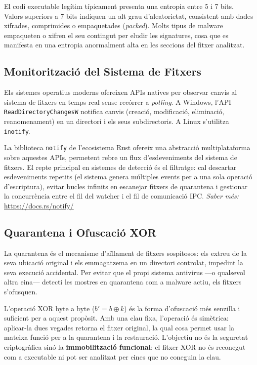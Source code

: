 \documentclass[12pt,a4paper]{report}
\begin{document}
El codi executable legítim típicament presenta una entropia entre 5 i 7 bits. Valors superiors a 7 bits indiquen un alt grau d'aleatorietat, consistent amb dades xifrades, comprimides o empaquetades (\textit{packed}). Molts tipus de malware empaqueten o xifren el seu contingut per eludir les signatures, cosa que es manifesta en una entropia anormalment alta en les seccions del fitxer analitzat.

\subsection{Monitorització del Sistema de Fitxers}
Els sistemes operatius moderns ofereixen APIs natives per observar canvis al sistema de fitxers en temps real sense recórrer a \textit{polling}. A Windows, l'API \texttt{ReadDirectoryChangesW} notifica canvis (creació, modificació, eliminació, reanomenament) en un directori i els seus subdirectoris. A Linux s'utilitza \texttt{inotify}.

La biblioteca \texttt{notify} de l'ecosistema Rust ofereix una abstracció multiplataforma sobre aquestes APIs, permetent rebre un flux d'esdeveniments del sistema de fitxers. El repte principal en sistemes de detecció és el filtratge: cal descartar esdeveniments repetits (el sistema genera múltiples events per a una sola operació d'escriptura), evitar bucles infinits en escanejar fitxers de quarantena i gestionar la concurrència entre el fil del watcher i el fil de comunicació IPC.
\textit{Saber més:} \url{https://docs.rs/notify/}

\subsection{Quarantena i Ofuscació XOR}
La quarantena és el mecanisme d'aïllament de fitxers sospitosos: els extreu de la seva ubicació original i els emmagatzema en un directori controlat, impedint la seva execució accidental. Per evitar que el propi sistema antivirus ---o qualsevol altra eina--- detecti les mostres en quarantena com a malware actiu, els fitxers s'ofusquen.

L'operació XOR byte a byte ($b' = b \oplus k$) és la forma d'ofuscació més senzilla i suficient per a aquest propòsit. Amb una clau fixa, l'operació és simètrica: aplicar-la dues vegades retorna el fitxer original, la qual cosa permet usar la mateixa funció per a la quarantena i la restauració. L'objectiu no és la seguretat criptogràfica sinó la \textbf{immobilització funcional}: el fitxer XOR no és reconegut com a executable ni pot ser analitzat per eines que no coneguin la clau.
\end{document}
